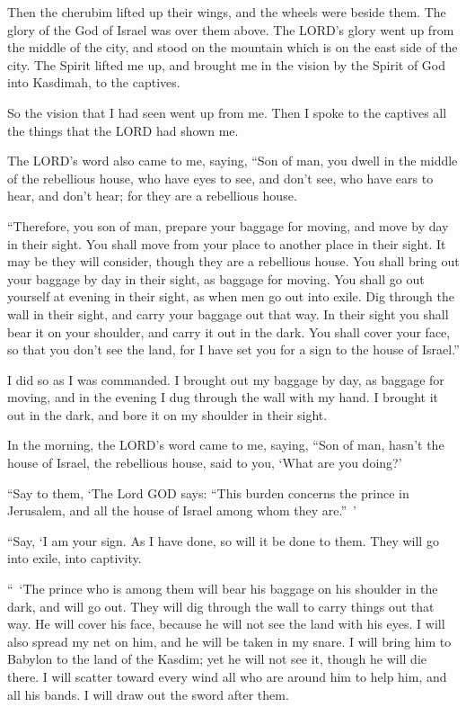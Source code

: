 \myverse{}Then the cherubim lifted up their wings, and the wheels were
beside them. The glory of the God of Israel was over them above.
\myverse{}The LORD’s glory went up from the middle of the city, and stood on the mountain
which is on the east side of the city.
\myverse{}The Spirit lifted me up, and brought me in the vision by the Spirit of God into Kasdimah,
to the captives.

So the vision that I had seen went up from me.
\myverse{}Then I spoke to the captives all the things that the LORD had shown me.


\mychapter{} \myverse*{}The LORD’s word also came to me, saying,
\myverse{}“Son of man, you dwell in the middle of the rebellious house, who have eyes
to see, and don’t see, who have ears to hear, and don’t hear; for they are a rebellious house.

\myverse{}“Therefore, you son of man, prepare your baggage for moving, and
move by day in their sight. You shall move from your place to another place in their sight. It may be
they will consider, though they are a rebellious house.
\myverse{}You shall bring out your baggage by day in their sight, as baggage for moving.
You shall go out yourself at evening in their sight, as when men go out into exile.
\myverse{}Dig through the wall in their sight, and carry your baggage out that way.
\myverse{}In their sight you shall bear it on your shoulder, and carry it out in the
dark. You shall cover your face, so that you don’t see the land, for I have set you for a sign to the
house of Israel.”

\myverse{}I did so as I was commanded. I brought out my baggage by day,
as baggage for moving, and in the evening I dug through the wall with my hand. I brought it out in the
dark, and bore it on my shoulder in their sight.

\myverse{}In the morning, the LORD’s word came to me, saying,
\myverse{}“Son of man, hasn’t the house of Israel, the rebellious house, said to you,
‘What are you doing?’

\myverse{}“Say to them, ‘The Lord GOD says: “This burden concerns the
prince in Jerusalem, and all the house of Israel among whom they are.” ’

\myverse{}“Say, ‘I am your sign. As I have done, so will it be done to
them. They will go into exile, into captivity.

\myverse{}“ ‘The prince who is among them will bear his baggage on his
shoulder in the dark, and will go out. They will dig through the wall to carry things out that way. He
will cover his face, because he will not see the land with his eyes.
\myverse{}I will also spread my net on him, and he will be taken in my snare. I will
bring him to Babylon to the land of the Kasdim; yet he will not see it, though he will die there.
\myverse{}I will scatter toward every wind all who are around him to help him, and
all his bands. I will draw out the sword after them.

